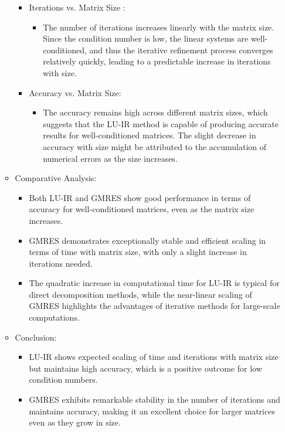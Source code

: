 \begin{enumerate}
\begin{itemize}
\begin{itemize}
\begin{itemize}
            \end{itemize}
            \item Iterations vs. Matrix Size :
            \begin{itemize}
                \item The number of iterations increases linearly with the matrix size. Since the condition number is low, the linear systems are well-conditioned, and thus the iterative refinement process converges relatively quickly, leading to a predictable increase in iterations with size.
            \end{itemize}
            
            \item Accuracy vs. Matrix Size:
            \begin{itemize}
                \item The accuracy remains high across different matrix sizes, which suggests that the LU-IR method is capable of producing accurate results for well-conditioned matrices. The slight decrease in accuracy with size might be attributed to the accumulation of numerical errors as the size increases.
            \end{itemize}
        \end{itemize}
        \item Comparative Analysis:
        \begin{itemize}
            \item Both LU-IR and GMRES show good performance in terms of accuracy for well-conditioned matrices, even as the matrix size increases.
           \item GMRES demonstrates exceptionally stable and efficient scaling in terms of time with matrix size, with only a slight increase in iterations needed.
           \item The quadratic increase in computational time for LU-IR is typical for direct decomposition methods, while the near-linear scaling of GMRES highlights the advantages of iterative methods for large-scale computations.
        \end{itemize}
        \item Conclusion:
        \begin{itemize}
            \item     LU-IR shows expected scaling of time and iterations with matrix size but maintains high accuracy, which is a positive outcome for low condition numbers.
           \item GMRES exhibits remarkable stability in the number of iterations and maintains accuracy, making it an excellent choice for larger matrices even as they grow in size.

\end{itemize}
\end{itemize}
\end{enumerate}
